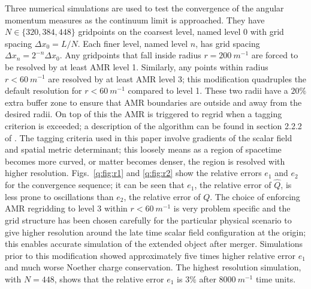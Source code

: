 Three numerical simulations are used to test the convergence of the angular momentum measures as the continuum limit is approached. They have $N\in\{320,384,448\}$ gridpoints on the coarsest level, named level $0$ with grid spacing $\Delta x_0 = L/N$. Each finer level, named level $n$, has grid spacing $\Delta x_n = 2^{-n} \Delta x_0$. Any gridpoints that fall inside radius $r= 200 ~m^{-1}$ are forced to be resolved by at least AMR level 1. Similarly, any points within radius $r<60 ~m^{-1}$ are resolved by at least AMR level 3; this modification quadruples the default resolution for $r<60 ~m^{-1}$ compared to level 1. These two radii have a $20\%$ extra buffer zone to ensure that AMR boundaries are outside and away from the desired radii. On top of this the AMR is triggered to regrid when a tagging criterion is exceeded; a description of the algorithm can be found in section 2.2.2 of \cite{Clough_2015}. The tagging criteria used in this paper involve gradients of the scalar field and spatial metric determinant; this loosely means as a region of spacetime becomes more curved, or matter becomes denser, the region is resolved with higher resolution. Figs.~\ref{q:fig:r1} and \ref{q:fig:r2} show the relative errors $e_1$ and $e_2$ for the convergence sequence; it can be seen that $e_1$, the relative error of $\hat Q$, is less prone to oscillations than $e_2$, the relative error of $Q$. The choice of enforcing AMR regridding to level 3 within $r<60 ~m^{-1}$ is very problem specific and the grid structure has been chosen carefully for the particular physical scenario to give higher resolution around the late time scalar field configuration at the origin; this enables accurate simulation of the extended object after merger. Simulations prior to this modification showed approximately five times higher relative error $e_1$ and much worse Noether charge conservation. The highest resolution simulation, with $N=448$, shows that the relative error $e_1$ is $3\%$ after $8000 ~m^{-1}$ time units.




